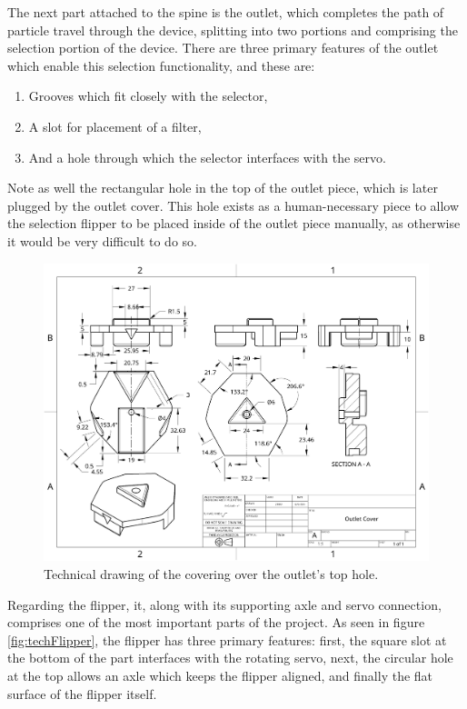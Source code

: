 \documentclass[fleqn,10pt]{SelfArx} %
\begin{document}
	The next part attached to the spine is the outlet, which completes the path of particle travel through the device, splitting into two portions and comprising the selection portion of the device. There are three primary features of the outlet which enable this selection functionality, and these are: 
	\begin{enumerate}
		\item Grooves which fit closely with the selector,
		\item A slot for placement of a filter,
		\item And a hole through which the selector interfaces with the servo.
	\end{enumerate}
	Note as well the rectangular hole in the top of the outlet piece, which is later plugged by the outlet cover. This hole exists as a human-necessary piece to allow the selection flipper to be placed inside of the outlet piece manually, as otherwise it would be very difficult to do so.			
	\begin{figure}[h]
		\centering
		\includegraphics[width=1\linewidth]{Figures/TechCover}
		\caption[Outlet Covering Tech. Drawing]{Technical drawing of the covering over the outlet's top hole.}
		\label{fig:techCover}
	\end{figure} 
	Regarding the flipper, it, along with its supporting axle and servo connection, comprises one of the most important parts of the project. As seen in figure \ref{fig:techFlipper}, the flipper has three primary features: first, the square slot at the bottom of the part interfaces with the rotating servo, next, the circular hole at the top allows an axle which keeps the flipper aligned, and finally the flat surface of the flipper itself. 
\end{document}
